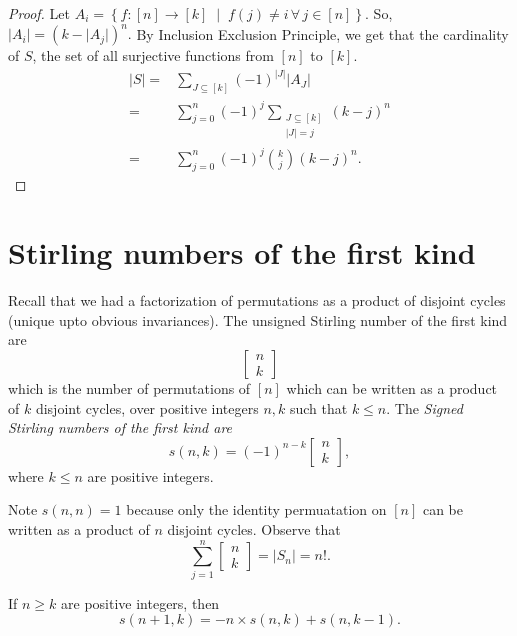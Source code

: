 \begin{proof}
Let $A_i = \left\{ f \colon [n] \to [k] \; \middle| \;
f(j) \not =  i \, \forall \, j \in [n] \right\}.$
So, $ \lvert A_i \rvert = (k - \lvert A_j \rvert )^n.$
By Inclusion Exclusion Principle, we get that the cardinality of $S$, 
the set of all surjective functions from $[n]$ to $[k].$
\begin{align*}
	\lvert S \rvert ={}& \sum_{J \subseteq [k]} (-1)^{ \lvert J \rvert} \lvert A_J \rvert \\
	={}& \sum_{j=0}^{n} (-1)^j \sum_{\substack{J \subseteq [k] \\
\lvert J \rvert = j }} (k - j)^n \\
	={}& \sum_{j=0}^{n} (-1)^j \binom{k}{j} (k-j)^n.
\end{align*}
\end{proof}


\section{Stirling numbers of the first kind}
Recall that we had a factorization of permutations as a product of disjoint cycles (unique upto obvious invariances).
The unsigned Stirling number of the first kind 
are 
$$ \begin{bmatrix} n\\k \end{bmatrix} $$
which is the number of permutations of $[n]$ which can be written as a product of $k$ disjoint cycles, over positive integers $n,k$ such that $k \leq n .$
The \emph{Signed Stirling numbers of the first kind are} $$s(n,k) = (-1)^{n-k} \begin{bmatrix} n\\k \end{bmatrix} , $$
where $k \leq n$ are positive integers.

Note $s(n,n) = 1$ because only the identity permuatation on $[n]$ can be written as a product of $n$ disjoint cycles. Observe that
$$ \sum_{j=1}^{n}  \begin{bmatrix} n \\ k \end{bmatrix} 
= \lvert S_n \rvert = n!. $$

\begin{theorem}
	If $n \geq k$ are positive integers, then 
	$$ s(n+1, k) = - n \times s(n,k) + s(n, k-1). $$
\end{theorem}

